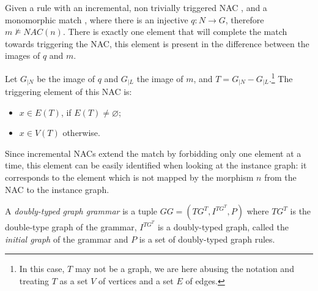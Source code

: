 \begin{definition} Given a rule \graphrule{} with an incremental, non trivially triggered NAC \nac{}, and a monomorphic match \match{}, where there is an injective $q : N \rightarrow G$, therefore $m \not\models NAC(n)$. There is exactly one element that will complete the match towards triggering the NAC, this element is present in the difference between the images of $q$ and $m$.

  Let $G_{|N}$ be the image of $q$ and $G_{|L}$ the image of $m$, and \mbox{$T = G_{|N} - G_{|L}$}.\footnote{In this case, $T$ may not be a graph, we are here abusing the notation and treating $T$ as a set $V$ of vertices and a set $E$ of edges.} The triggering element of this NAC is:

  \begin{itemize}
    \item $x \in E(T)$, if $E(T) \neq \varnothing$;
    \item $x \in V(T)$ otherwise.
  \end{itemize} 
\end{definition}

\begin{example}
Since incremental NACs extend the match by forbidding only one element at a time, this element can be easily identified when looking at the instance graph: it corresponds to the element which is not mapped by the morphism $n$ from the NAC to the instance graph.
\end{example}

\begin{definition} A \emph{doubly-typed graph grammar} is a tuple $GG = \left(TG^T, I^{TG^T},P \right)$ where $TG^T$ is the double-type graph of the grammar, $I^{TG^T}$ is a doubly-typed graph, called the \emph{initial graph} of the grammar and $P$ is a set of doubly-typed graph rules.
\end{definition}

